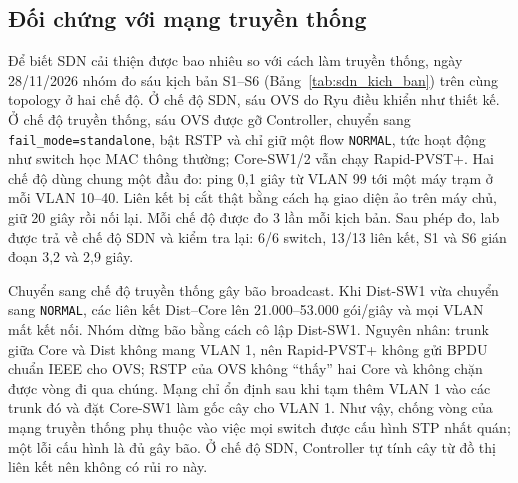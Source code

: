 \subsection{Đối chứng với mạng truyền thống}\label{sec:doi_chung_rstp}

Để biết SDN cải thiện được bao nhiêu so với cách làm truyền thống, ngày 28/11/2026 nhóm đo sáu kịch bản S1--S6 (Bảng~\ref{tab:sdn_kich_ban}) trên cùng topology ở hai chế độ. Ở chế độ SDN, sáu OVS do Ryu điều khiển như thiết kế. Ở chế độ truyền thống, sáu OVS được gỡ Controller, chuyển sang \texttt{fail\_mode=standalone}, bật RSTP và chỉ giữ một flow \texttt{NORMAL}, tức hoạt động như switch học MAC thông thường; Core-SW1/2 vẫn chạy Rapid-PVST+. Hai chế độ dùng chung một đầu đo: ping 0,1 giây từ VLAN 99 tới một máy trạm ở mỗi VLAN 10--40. Liên kết bị cắt thật bằng cách hạ giao diện ảo trên máy chủ, giữ 20 giây rồi nối lại. Mỗi chế độ được đo 3 lần mỗi kịch bản. Sau phép đo, lab được trả về chế độ SDN và kiểm tra lại: 6/6 switch, 13/13 liên kết, S1 và S6 gián đoạn 3,2 và 2,9 giây.

Chuyển sang chế độ truyền thống gây bão broadcast. Khi Dist-SW1 vừa chuyển sang \texttt{NORMAL}, các liên kết Dist--Core lên 21.000--53.000 gói/giây và mọi VLAN mất kết nối. Nhóm dừng bão bằng cách cô lập Dist-SW1. Nguyên nhân: trunk giữa Core và Dist không mang VLAN 1, nên Rapid-PVST+ không gửi BPDU chuẩn IEEE cho OVS; RSTP của OVS không ``thấy'' hai Core và không chặn được vòng đi qua chúng. Mạng chỉ ổn định sau khi tạm thêm VLAN 1 vào các trunk đó và đặt Core-SW1 làm gốc cây cho VLAN 1. Như vậy, chống vòng của mạng truyền thống phụ thuộc vào việc mọi switch được cấu hình STP nhất quán; một lỗi cấu hình là đủ gây bão. Ở chế độ SDN, Controller tự tính cây từ đồ thị liên kết nên không có rủi ro này.


